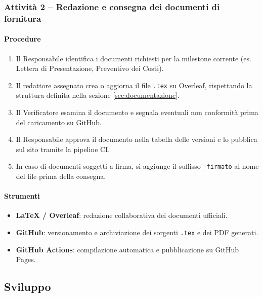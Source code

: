 \documentclass[a4paper, 11pt, oneside]{scrartcl}
\begin{document}
\subsubsection{Attività 2 – Redazione e consegna dei documenti di fornitura}

\paragraph{Procedure}
\begin{enumerate}
    \item Il Responsabile identifica i documenti richiesti per la milestone{\scriptsize{}} corrente (es. Lettera di Presentazione, Preventivo dei Costi).
    \item Il redattore assegnato crea o aggiorna il file \texttt{.tex} su Overleaf, rispettando la struttura definita nella sezione \ref{sec:documentazione}.
    \item Il Verificatore esamina il documento e segnala eventuali non conformità prima del caricamento su GitHub.
    \item Il Responsabile approva il documento nella tabella delle versioni e lo pubblica sul sito tramite la pipeline CI{\scriptsize{}}.
    \item In caso di documenti soggetti a firma, si aggiunge il suffisso \texttt{\_firmato} al nome del file prima della consegna.
\end{enumerate}

\paragraph{Strumenti}
\begin{itemize}
    \item \textbf{\LaTeX{} / Overleaf}: redazione collaborativa dei documenti ufficiali.
    \item \textbf{GitHub}: versionamento e archiviazione dei sorgenti \texttt{.tex} e dei PDF generati.
    \item \textbf{GitHub Actions}: compilazione automatica e pubblicazione su GitHub Pages.
\end{itemize}

\subsection{Sviluppo}
\end{document}
